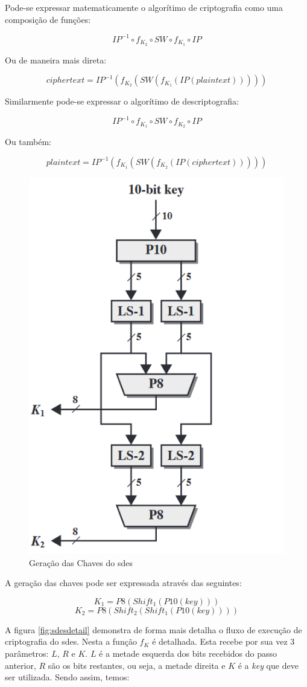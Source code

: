 Pode-se expressar matematicamente o algorítimo de criptografia como uma composição de funções:

\[IP^{-1} \circ f_{K_2} \circ SW \circ f_{K_1} \circ IP\]

Ou de maneira mais direta:

\[ciphertext = IP^{-1}(f_{K_2}(SW(f_{K_1}(IP(plaintext)))))\]

Similarmente pode-se expressar o algorítimo de descriptografia:

\[IP^{-1} \circ f_{K_1} \circ SW \circ f_{K_2} \circ IP\]

Ou também:

\[plaintext = IP^{-1}(f_{K_1}(SW(f_{K_2}(IP(ciphertext)))))\]

\begin{figure}[H]
    \centering
    \caption{Geração das Chaves do \acrshort{sdes}}
    \includegraphics[width=.5\linewidth]{Figuras/SDESKeysGen.png}
\end{figure}

A geração das chaves pode ser expressada através das seguintes:

\[K_1 = P8(Shift_1(P10(key)))\]
\[K_2 = P8(Shift_2(Shift_1(P10(key))))\]

A figura \ref{fig:sdesdetail} demonstra de forma mais detalha o fluxo de execução de criptografia do \acrshort{sdes}. Nesta a função \(f_K\) é detalhada. Esta recebe por sua vez 3 parâmetros: \(L\), \(R\) e \(K\). \(L\) é a metade esquerda dos bits recebidos do passo anterior, \(R\) são os bits restantes, ou seja, a metade direita e \(K\) é a \textit{key} que deve ser utilizada. Sendo assim, temos:

